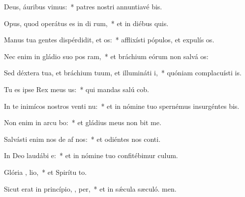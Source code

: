 \item Deus, áuribus  vimus:~* patres nostri annuntiavé bis.
\item Opus, quod operátus es in di rum,~* et in diébus quis.
\item Manus tua gentes dispérdidit, et  os:~* afflixísti pópulos, et expulís os.
\item Nec enim in gládio suo pos ram,~* et bráchium eórum non salvá os:
\item Sed déxtera tua, et bráchium tuum, et illumináti  i,~* quóniam complacuísti  is.
\item Tu es ipse Rex meus   us:~* qui mandas salú cob.
\item In te inimícos nostros venti nu:~* et in nómine tuo spernémus insurgéntes  bis.
\item Non enim in arcu  bo:~* et gládius meus non bit me.
\item Salvásti enim nos de af nos:~* et odiéntes nos conti.
\item In Deo laudábi  e:~* et in nómine tuo confitébimur  culum.
\item Glória ,  lio,~* et Spirítu to.
\item Sicut erat in princípio,  ,  per,~* et in sǽcula sæculó. men.
